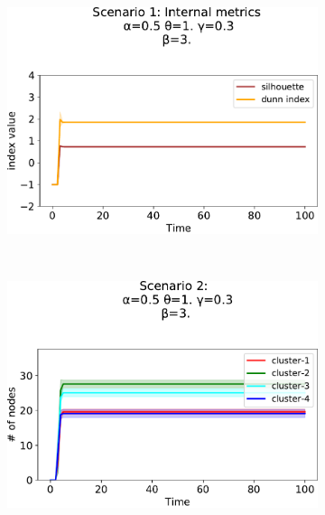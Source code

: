 \begin{figure}[!ht]
\begin{subfigure}[b]{0.32\textwidth}
    \includegraphics[width=\textwidth]{papers/swarm-intelligence2021/img/simulations/standard-metrics_0_0910_α-0.5_θ-1._γ-0.3_β-3._ω-0._ζ-0..pdf}
  \end{subfigure}
  \\
  \begin{subfigure}[b]{0.32\textwidth}
    \centering
    \includegraphics[width=\textwidth]{papers/swarm-intelligence2021/img/simulations/stretched-count_0_03456_α-0.5_θ-1._γ-0.3_β-3._ω-0._ζ-0..pdf}
  \end{subfigure}
  \hfill
  \begin{subfigure}[b]{0.32\textwidth}
    \centering

\end{subfigure}
\end{figure}
